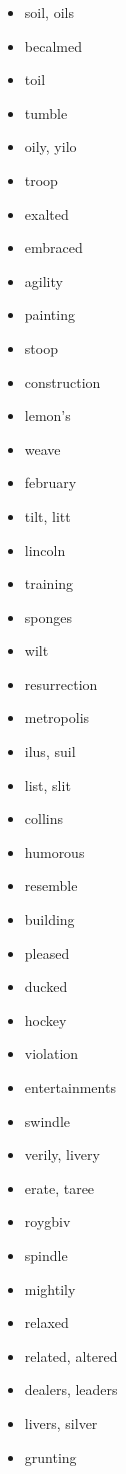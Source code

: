 \documentclass{article}
\begin{document}
\begin{itemize}
    \item soil, oils
    \item becalmed
    \item toil
    \item tumble
    \item oily, yilo
    \item troop
    \item exalted
    \item embraced
    \item agility
    \item painting
    \item stoop
    \item construction
    \item lemon's
    \item weave
    \item february
    \item tilt, litt
    \item lincoln
    \item training
    \item sponges
    \item wilt
    \item resurrection
    \item metropolis
    \item ilus, suil
    \item list, slit
    \item collins
    \item humorous
    \item resemble
    \item building
    \item pleased
    \item ducked
    \item hockey
    \item violation
    \item entertainments
    \item swindle
    \item verily, livery
    \item erate, taree
    \item roygbiv
    \item spindle
    \item mightily
    \item relaxed
    \item related, altered
    \item dealers, leaders
    \item livers, silver
    \item grunting

\end{itemize}
\end{document}
